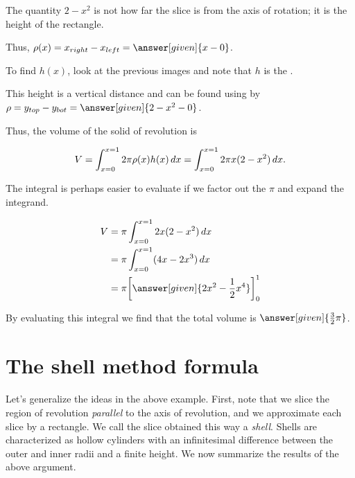 \documentclass{ximera}
\begin{document}
\begin{model}
\begin{feedback}
\begin{image}
            \end{image}     

The quantity $2-x^2$ is not how far the slice is from the axis of rotation; it is the height of the rectangle.

 \end{feedback}

Thus, $\rho(x) = x_{right}-x_{left} = \answer[given]{x-0}$.

To find $h(x)$, look at the previous images and note that $h$ is the .

This height is a vertical distance and can be found using by $\rho = y_{top}-y_{bot} = \answer[given]{2-x^2-0}$.


Thus, the volume of the solid of revolution is

\[
V = \int_{x=0}^{x=1} 2 \pi \rho(x) h(x) \mathop{}\!d x = \int_{x=0}^{x=1} 2 \pi x(2-x^2) \mathop{}\!d x.
\]

The integral is perhaps easier to evaluate if we factor out the $\pi$ and expand the integrand.

\begin{align*}
V &= \pi \int_{x=0}^{x=1} 2x(2-x^2) \d x \\
&= \pi \int_{x=0}^{x=1} (4x-2x^3) \d x \\
&= \pi \eval{\answer[given]{2x^2-\frac{1}{2}x^4}}_0^1
\end{align*}

By evaluating this integral we find that the total volume is $\answer[given]{\frac{3}{2}\pi}$.   
\end{model}

\section{The shell method formula}
Let's generalize the ideas in the above example.  First, note that we slice the region of revolution \emph{parallel} to the axis of revolution, and we approximate each slice by a rectangle.  We call the slice obtained this way a \emph{shell}.  Shells are characterized as hollow cylinders with an infinitesimal difference between the outer and inner radii and a finite height.  We now summarize the results of the above argument.
\end{document}
